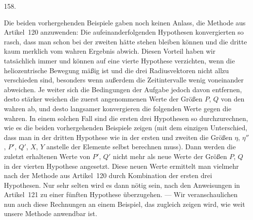 \par{}\medskip
\hypertarget{native-217-article158}{}
\begin{center}158.\end{center}
Die beiden vorhergehenden Beispiele gaben noch keinen Anlass, die Methode aus Artikel~120 anzuwenden: Die aufeinanderfolgenden Hypothesen konvergierten so rasch, dass man schon bei der zweiten hätte stehen bleiben können und die dritte kaum merklich vom wahren Ergebnis abwich. Diesen Vorteil haben wir tatsächlich immer und können auf eine vierte Hypothese verzichten, wenn die heliozentrische Bewegung mäßig ist und die drei Radiusvektoren nicht allzu verschieden sind, besonders wenn außerdem die Zeitintervalle wenig voneinander abweichen. Je weiter sich die Bedingungen der Aufgabe jedoch davon entfernen, desto stärker weichen die zuerst angenommenen Werte der Größen $P$, $Q$ von den wahren ab, und desto langsamer konvergieren die folgenden Werte gegen die wahren. In einem solchen Fall sind die ersten drei Hypothesen so durchzurechnen, wie es die beiden vorhergehenden Beispiele zeigen (mit dem einzigen Unterschied, dass man in der dritten Hypothese wie in der ersten und zweiten die
Größen $\eta$, $\eta''$, $P'$, $Q'$, $X$, $Y$ anstelle der Elemente selbst berechnen muss). Dann werden die zuletzt erhaltenen Werte von $P'$, $Q'$ nicht mehr als neue Werte der Größen $P$, $Q$ in der vierten Hypothese angesetzt. Diese neuen Werte ermittelt man vielmehr nach der Methode aus Artikel~120 durch Kombination der ersten drei Hypothesen. Nur sehr selten wird es dann nötig sein, nach den Anweisungen in Artikel~121 zu einer fünften Hypothese überzugehen. --- Wir veranschaulichen nun auch diese Rechnungen an einem Beispiel, das zugleich zeigen wird, wie weit unsere Methode anwendbar ist.
